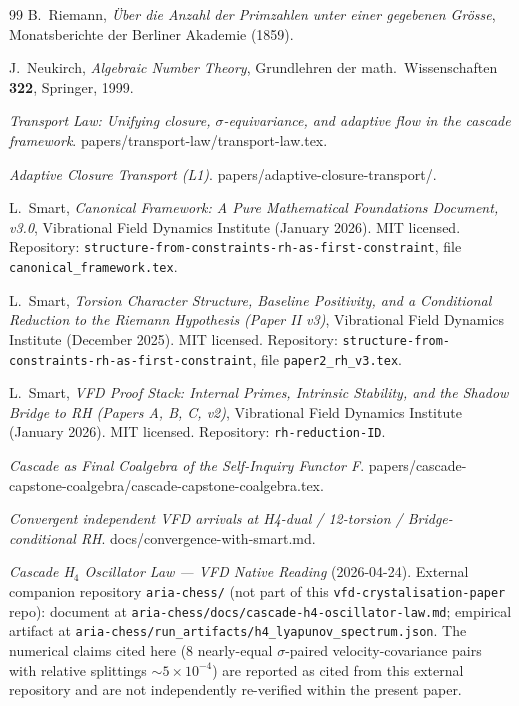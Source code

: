 \documentclass[11pt, a4paper]{amsart}
\theoremstyle{definition}
\begin{document}
\begin{thebibliography}{99}
B.~Riemann, \emph{\"Uber die Anzahl der Primzahlen unter einer gegebenen Gr\"osse},
Monatsberichte der Berliner Akademie (1859).

J.~Neukirch, \emph{Algebraic Number Theory},
Grundlehren der math.\ Wissenschaften \textbf{322}, Springer, 1999.

\emph{Transport Law: Unifying closure, $\sigma$-equivariance, and adaptive flow in the cascade framework}.
papers/transport-law/transport-law.tex.

\emph{Adaptive Closure Transport (L1)}. papers/adaptive-closure-transport/.

L.~Smart, \emph{Canonical Framework: A Pure Mathematical Foundations Document, v3.0},
Vibrational Field Dynamics Institute (January 2026). MIT licensed.
Repository: \texttt{structure-from-constraints-rh-as-first-constraint},
file \texttt{canonical\_framework.tex}.

L.~Smart, \emph{Torsion Character Structure, Baseline Positivity, and a Conditional
Reduction to the Riemann Hypothesis (Paper II v3)}, Vibrational Field Dynamics
Institute (December 2025). MIT licensed. Repository:
\texttt{structure-from-constraints-rh-as-first-constraint},
file \texttt{paper2\_rh\_v3.tex}.

L.~Smart, \emph{VFD Proof Stack: Internal Primes, Intrinsic Stability, and the
Shadow Bridge to RH (Papers A, B, C, v2)}, Vibrational Field Dynamics Institute
(January 2026). MIT licensed. Repository: \texttt{rh-reduction-ID}.

\emph{Cascade as Final Coalgebra of the Self-Inquiry Functor F}.
papers/cascade-capstone-coalgebra/cascade-capstone-coalgebra.tex.

\emph{Convergent independent VFD arrivals at H4-dual / 12-torsion /
Bridge-conditional RH}. docs/convergence-with-smart.md.

\emph{Cascade H$_4$ Oscillator Law — VFD Native Reading}
(2026-04-24).  External companion repository
\texttt{aria-chess/} (not part of this
\texttt{vfd-crystalisation-paper} repo): document at
\texttt{aria-chess/docs/cascade-h4-oscillator-law.md};
empirical artifact at
\texttt{aria-chess/run\_artifacts/h4\_lyapunov\_spectrum.json}.
The numerical claims cited here ($8$ nearly-equal
$\sigma$-paired velocity-covariance pairs with relative splittings
$\sim 5\times 10^{-4}$) are reported as cited from this external
repository and are not independently re-verified within the
present paper.


\end{thebibliography}
\end{document}
